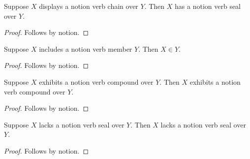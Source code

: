 \begin{proposition}\label{notion_verb_chain_use}
    Suppose $X$ displays a notion verb chain over $Y$.
    Then $X$ has a notion verb seal over $Y$.
\end{proposition}
\begin{proof}
    Follows by notion.
\end{proof}

\begin{proposition}\label{notion_verb_member_alias_use}
    Suppose $X$ includes a notion verb member $Y$.
    Then $X\in Y$.
\end{proposition}
\begin{proof}
    Follows by notion.
\end{proof}

\begin{proposition}\label{notion_verb_compound_alias_use}
    Suppose $X$ exhibits a notion verb compound over $Y$.
    Then $X$ exhibits a notion verb compound over $Y$.
\end{proposition}
\begin{proof}
    Follows by notion.
\end{proof}

\begin{proposition}\label{notion_verb_negative_alias_use}
    Suppose $X$ lacks a notion verb seal over $Y$.
    Then $X$ lacks a notion verb seal over $Y$.
\end{proposition}
\begin{proof}
    Follows by notion.
\end{proof}
